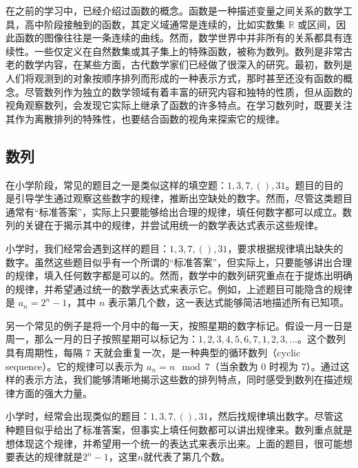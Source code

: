 
\begin{issues}
\issueDraft
\end{issues}

在之前的学习中，已经介绍过函数的概念。函数是一种描述变量之间关系的数学工具，高中阶段接触到的函数，其定义域通常是连续的，比如实数集 $\mathbb{R}$ 或区间，因此函数的图像往往是一条连续的曲线。然而，数学世界中并非所有的关系都具有连续性。一些仅定义在自然数集或其子集上的特殊函数，被称为数列。数列是非常古老的数学内容，在某些方面，古代数学家们已经做了很深入的研究。最初，数列是人们将观测到的对象按顺序排列而形成的一种表示方式，那时甚至还没有函数的概念。尽管数列作为独立的数学领域有着丰富的研究内容和独特的性质，但从函数的视角观察数列，会发现它实际上继承了函数的许多特点。在学习数列时，既要关注其作为离散排列的特殊性，也要结合函数的视角来探索它的规律。

\subsection{数列}

在小学阶段，常见的题目之一是类似这样的填空题：$1,3,7,(),31$。题目的目的是引导学生通过观察这些数字的规律，推断出空缺处的数字。然而，尽管这类题目通常有“标准答案”，实际上只要能够给出合理的规律，填任何数字都可以成立。数列的关键在于揭示其中的规律，并尝试用统一的数学表达式表示这些规律。

小学时，我们经常会遇到这样的题目：$1, 3, 7, (), 31$，要求根据规律填出缺失的数字。虽然这些题目似乎有一个所谓的“标准答案”，但实际上，只要能够讲出合理的规律，填入任何数字都是可以的。然而，数学中的数列研究重点在于提炼出明确的规律，并希望通过统一的数学表达式来表示它。例如，上述题目可能隐含的规律是 $a_n = 2^n - 1$，其中 $n$ 表示第几个数，这一表达式能够简洁地描述所有已知项。

另一个常见的例子是将一个月中的每一天，按照星期的数字标记。假设一月一日是周一，那么一月的日子按照星期可以标记为：$1, 2, 3, 4, 5, 6, 7, 1, 2, 3, \dots$。这个数列具有周期性，每隔 7 天就会重复一次，是一种典型的循环数列（cyclic sequence）。它的规律可以表示为 $a_n = n \mod 7$（当余数为 0 时视为 7）。通过这样的表示方法，我们能够清晰地揭示这些数的排列特点，同时感受到数列在描述规律方面的强大力量。

小学时，经常会出现类似的题目：$1,3,7,(),31$，然后找规律填出数字。尽管这种题目似乎给出了标准答案，但事实上填任何数都可以讲出规律来。数列重点就是想体现这个规律，并希望用一个统一的表达式来表示出来。上面的题目，很可能想要表达的规律就是$2^n-1$，这里$n$就代表了第几个数。

